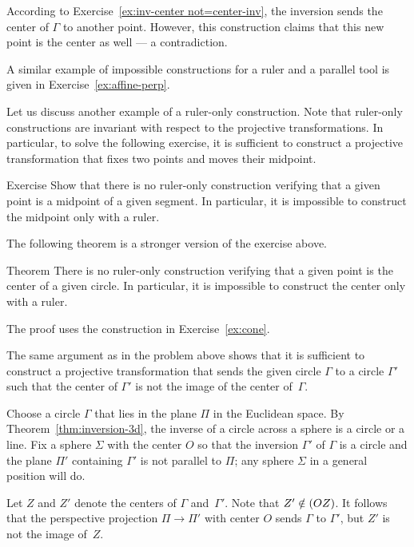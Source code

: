 According to Exercise~\ref{ex:inv-center not=center-inv}, 
the inversion sends the center of $\Gamma$ to another point.
However, this construction claims that this new point is the center as well --- a contradiction.
\qeds

A similar example of impossible constructions for a ruler and a parallel tool
 is given in Exercise~\ref{ex:affine-perp}.
 
Let us discuss another example of a ruler-only construction.
Note that ruler-only constructions are invariant with respect to the projective transformations. 
In particular, to solve the following exercise, it is sufficient to construct a projective transformation that fixes two points and moves their midpoint.

\begin{thm}{Exercise}\label{ex:midpoint-proj}
Show that there is no ruler-only construction verifying that a given point is a  midpoint of a given segment.
In particular, it is impossible to construct the midpoint only with a ruler.
\end{thm}

The following theorem is a stronger version of the exercise above.

\begin{thm}{Theorem}\label{thm:circle-center-proj}
There is no ruler-only construction verifying that a given point is the center of a given circle.
In particular, it is impossible to construct the center only with a ruler.
\end{thm}

The proof uses the construction in Exercise~\ref{ex:cone}.

The same argument as in the problem above shows that 
it is sufficient to construct a projective transformation 
that sends the given circle $\Gamma$ to a circle $\Gamma'$ such that the center of $\Gamma'$ is not the image of the center of~$\Gamma$.

Choose a circle $\Gamma$ that lies in the plane $\Pi$ in the Euclidean space.
By Theorem~\ref{thm:inversion-3d}, 
the inverse of a circle across a sphere is a circle or a line.
Fix a sphere $\Sigma$ with the center $O$ so that the inversion $\Gamma'$ of $\Gamma$
is a circle and the plane $\Pi'$ containing $\Gamma'$ is not parallel to $\Pi$;
any sphere $\Sigma$ in a general position will do.

Let $Z$ and $Z'$ denote the centers of $\Gamma$ and~$\Gamma'$.
Note that  $Z'\notin(OZ)$.
It follows that the perspective projection $\Pi\to \Pi'$ with center $O$ sends $\Gamma$ to $\Gamma'$, but $Z'$ is not the image of~$Z$.
\qeds

